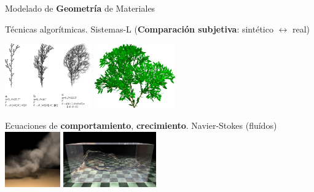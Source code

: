 \documentclass[spanish,unknownkeysallowed,10pt]{beamer}
\begin{document}
\begin{frame}{}

Modelado de \textbf{Geometría} de Materiales

\begin{block}{}
Técnicas algorítmicas. Sistemas-L (\textbf{Comparación subjetiva}: sintético $\leftrightarrow$ real)

\center

\includegraphics[width=3.7cm]{../figures/sistemalcorchete}
\includegraphics[width=3.54cm]{../figures/3dlsystem}

\end{block}
\begin{block}{}

Ecuaciones de \textbf{comportamiento}, \textbf{crecimiento}. Navier-Stokes (fluídos)
\center
\includegraphics[width=2.385cm]{../figures/smoke}
\includegraphics[width=4cm]{../figures/water}
\end{block}

\end{frame}
\end{document}
